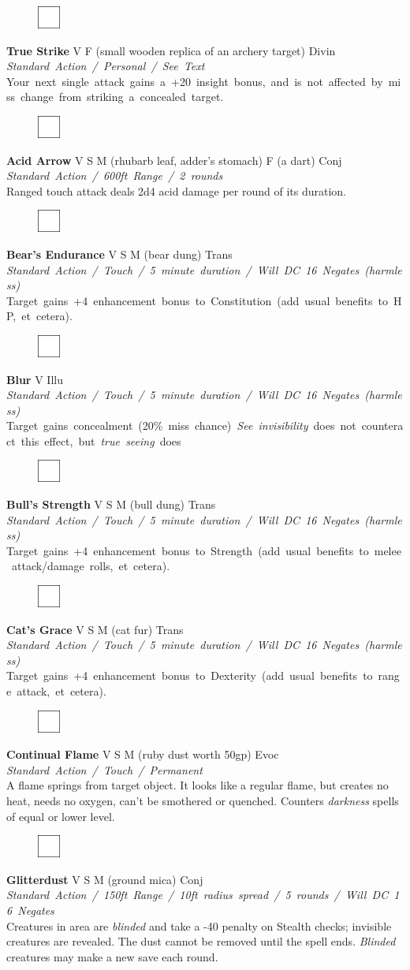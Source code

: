 \documentclass[letterpaper]{article}
\newcommand{\spell}[7]{
\begin{figure}
\vspace{-13pt}
\ifstrequal{#2}{Full}{\includegraphics[width=2em]{Checkbox-Full}}{
                      \includegraphics[width=2em]{Checkbox}}
\ifstrequal{#7}{}{\vspace{-1em}}{\vspace{#7}}
\end{figure}
\noindent \textbf{#1} #3 {
    \ifstrequal{#4}{Conj}{\color{Plum}Conj}{%
    \ifstrequal{#4}{Divin}{\color{YellowOrange}Divin}{%
    \ifstrequal{#4}{Ench}{\color{VioletRed}Ench}{%
    \ifstrequal{#4}{Trans}{\color{LimeGreen}Trans}{%
    \ifstrequal{#4}{Evoc}{\color{RedOrange}Evoc}{%
    \ifstrequal{#4}{Illu}{\color{ProcessBlue}Illu}{%
    \ifstrequal{#4}{Abjur}{\color{CadetBlue}Abjur}{%
    \ifstrequal{#4}{Necro}{\color{Red}Necro}{%
}}}}}}}}}
{\footnotesize \emph{#5}} \\
#6
}
\begin{document}
\spell{True Strike}{}{V F (small wooden replica of an archery target)}{Divin}{\mbox{Standard Action / Personal / See Text}}{%
\mbox{Your next single attack gains a +20 insight bonus, and is not affected by miss change from striking a concealed target.}}{}\\

\spell{Acid Arrow}{}{V S M (rhubarb leaf, adder's stomach) F (a dart)}{Conj}{\mbox{Standard Action / 600ft Range / 2 rounds}}{%
Ranged touch attack deals 2d4 acid damage per round of its duration.}{}\\[-1em] %

\spell{Bear's Endurance}{}{V S M (bear dung)}{Trans}{\mbox{Standard Action / Touch / 5 minute duration / Will DC 16 Negates (harmless)}} {%
\mbox{Target gains +4 enhancement bonus to Constitution (add usual benefits to HP, et cetera).} }{}\\[-1em] %

\spell{Blur}{}{V}{Illu}{\mbox{Standard Action / Touch / 5 minute duration / Will DC 16 Negates (harmless)}}{%
\mbox{Target gains concealment (20\% miss chance) \emph{See invisibility} does not counteract this effect, but \emph{true seeing} does} }{}\\[-1em] %

\spell{Bull's Strength}{}{V S M (bull dung)}{Trans}{\mbox{Standard Action / Touch / 5 minute duration / Will DC 16 Negates (harmless)}}{%
\mbox{Target gains +4 enhancement bonus to Strength (add usual benefits to melee attack/damage rolls, et cetera).} }{}\\[-1em] %

\spell{Cat's Grace}{}{V S M (cat fur)}{Trans}{\mbox{Standard Action / Touch / 5 minute duration / Will DC 16 Negates (harmless)}}{%
\mbox{Target gains +4 enhancement bonus to Dexterity (add usual benefits to range attack, et cetera).} }{}\\[-1em] %

\spell{Continual Flame}{}{V S M (ruby dust worth 50gp)}{Evoc}{\mbox{Standard Action / Touch / Permanent}}{%
A flame springs from target object.  It looks like a regular flame, but creates no heat, needs no oxygen, can't be smothered or quenched.  Counters \emph{darkness} spells of equal or lower level.}{}

\spell{Glitterdust}{}{V S M (ground mica)}{Conj}{\mbox{Standard Action / 150ft Range / 10ft radius spread / 5 rounds / Will DC 16 Negates }}{%
Creatures in area are \emph{blinded} and take a -40 penalty on Stealth checks; invisible creatures are revealed. The dust cannot be removed until the spell ends. \emph{Blinded} creatures may make a new save each round.}{} %
\end{document}
